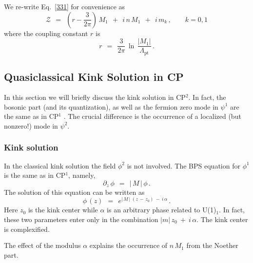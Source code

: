 \documentclass[epsfig,12pt]{article}
\def\beq{\begin{equation}}
\def\eeq{\end{equation}}
\def\beq{\begin{equation}}
\def\eeq{\end{equation}}
\newcommand{\p}{\partial}
\newcommand{\mc}[1]{\mathcal{#1}}
\begin{document}
	We re-write Eq.~\eqref{331} for convenience as 
\beq
\label{weak}
	\mc{Z}  ~~=~~  \left(r -\frac{3}{2\pi} \right)\, M_1  ~~+~~  i\, n  \, M_1
	~~+~~ i\,  m_k  \,, \qquad k=0,1
\eeq
	where the coupling constant $ r $ is
\beq
	r  ~~=~~  \frac{3}{2\pi}\,  \ln\, \frac {   |M_1|   }
                                               {  \Lambda_\text{pt}  } \, .
\eeq


\subsection[Quasiclassical Kink Solution in CP$^2$]
	{Quasiclassical Kink Solution in CP}
\label{kinksolu}

	In this section we will briefly discuss the kink solution in CP$^2$. 
	In fact, the bosonic part (and its quantization), 
	as well as the fermion zero mode in $ \psi^1 $ are the same as in CP$^1$ \cite{SYrev}. 
	The crucial difference is the occurrence of a localized (but nonzero!) mode in $ \psi^2 $.


\subsubsection{Kink solution}

	In the classical kink solution the field $ \phi^2 $ is not involved. 
	The BPS equation for $ \phi^1 $ is the same as in CP$^1$, namely,
\beq
	\p_z\, \phi ~~=~~ |\, M \,| \, \phi\,.
\label{13twentysix}
\eeq
	The solution of this equation  can be written as
\beq
	\phi\, (z)  ~~=~~  e^{ |\, M \,|\; (z \,-\, z_0) ~-~ i\,\alpha}\,.
\label{13twentyseven}
\eeq
	Here $ z_0 $ is the kink center while $ \alpha $ is an arbitrary phase related to U(1)$_1$.
	In fact, these two parameters enter only in the combination
	$ | m |\, z_0 ~+~ i\,\alpha $. The kink center is complexified. 

	The effect of the modulus $ \alpha $ explains the occurrence of 
	$ n\, M_1 $ from the Noether part.



\end{document}
